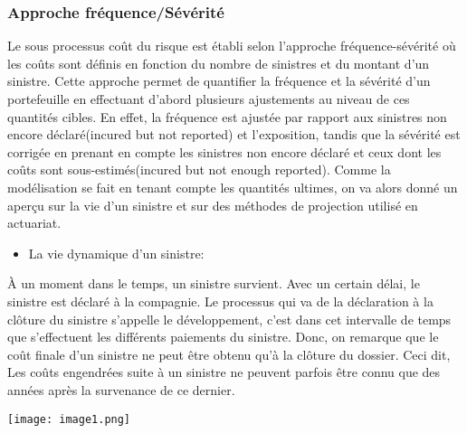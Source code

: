 \documentclass[11pt]{article}
\begin{document}
\subsubsection{Approche fréquence/Sévérité}
Le sous processus coût du risque est établi selon l’approche fréquence-sévérité où les coûts sont définis en fonction du
nombre de sinistres et du montant d'un sinistre.  Cette approche permet de quantifier la fréquence et la sévérité d’un portefeuille en effectuant d'abord plusieurs ajustements au niveau de ces quantités cibles. En effet, la fréquence est ajustée par rapport aux sinistres non encore déclaré(incured but not reported) et l’exposition, tandis que la sévérité est corrigée en prenant en compte les sinistres non encore déclaré et ceux dont les coûts sont sous-estimés(incured but not enough reported). Comme la modélisation se fait en tenant compte les quantités ultimes, on va alors donné un aperçu sur la vie d'un sinistre et sur des méthodes de projection utilisé en actuariat.
\begin{itemize}
\item La vie dynamique d'un sinistre:
\end{itemize}
À un moment dans le temps, un sinistre survient. Avec un certain délai, le sinistre est déclaré à la compagnie. Le processus qui va de la déclaration à la clôture du sinistre s'appelle le développement, c'est dans cet intervalle de temps que s'effectuent les différents paiements du sinistre. Donc, on remarque que le coût finale d'un sinistre ne peut être obtenu qu'à la clôture du dossier. Ceci dit, Les coûts engendrées suite à un sinistre ne peuvent parfois être connu que des années après la survenance de ce dernier.
\begin{center}
\texttt{[image: image1.png]}
\end{center}
\end{document}
